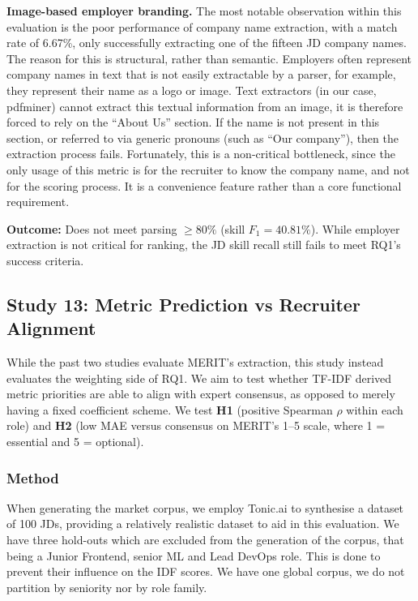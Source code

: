 \textbf{Image-based employer branding.} The most notable observation within this evaluation is the poor performance of company name extraction, with a match rate
of 6.67\%, only successfully extracting one of the fifteen JD company names. The reason for this is structural, rather than 
semantic. Employers often represent company names in text that is not easily extractable by a parser, for example, they
represent their name as a logo or image. Text extractors (in our case, pdfminer) cannot extract this textual information from
an image, it is therefore forced to rely on the ``About Us'' section. If the name is not present in this section, or 
referred to via generic pronouns (such as ``Our company''), then the extraction process fails. Fortunately, this is a non-critical
bottleneck, since the only usage of this metric is for the recruiter to know the company name, and not for the scoring process.
It is a convenience feature rather than a core functional requirement.

\textbf{Outcome:} Does not meet parsing $\geq 80\%$ (skill $F_1 = 40.81\%$).
While employer extraction is not critical for ranking, the JD skill recall still fails to meet RQ1's success criteria.

\subsection{Study 13: Metric Prediction vs Recruiter Alignment}
\label{subsec:study-13-metric-prediction}

While the past two studies evaluate MERIT's extraction, this study instead evaluates the weighting side of RQ1. We
aim to test whether TF-IDF derived metric priorities are able to align with expert consensus, as opposed to merely
having a fixed coefficient scheme.
We test \textbf{H1} (positive Spearman $\rho$ within each role) and \textbf{H2} (low MAE versus consensus on MERIT's 1--5 scale,
where 1 = essential and 5 = optional).

\subsubsection{Method}
When generating the market corpus, we employ Tonic.ai \cite{tonicai} to synthesise a dataset of 100 JDs, providing a relatively realistic
dataset to aid in this evaluation. We have three hold-outs which are excluded from the generation of the corpus, that being a Junior 
Frontend, senior ML and Lead DevOps role. This is done to prevent their influence on the IDF scores. We have one global corpus,
we do not partition by seniority nor by role family.

